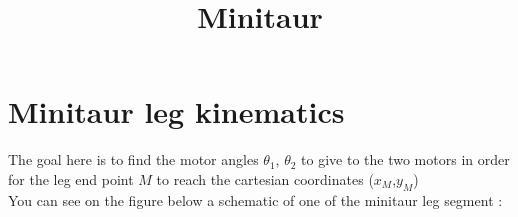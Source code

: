 \documentclass [11pt]{article}
\title{Minitaur}
\begin{document}
\section*{Minitaur leg kinematics}
The goal here is to find the motor angles $\theta_1$, $\theta_2$ to give to the two motors in order for the leg end point $M$ to reach the cartesian coordinates ($x_M$,$y_M$) \\
You can see on the figure below a schematic of one of the minitaur leg segment :

\pagestyle{empty}


%
\newcommand{\nvar}[2]{%
    \newlength{#1}
    \setlength{#1}{#2}
}

\nvar{\dg}{0.3cm}
\def\dw{0.25}\def\dh{0.5}
\nvar{\ddx}{1.5cm}

\def\link{\draw [double distance=1.5mm, very thick] (0,0)--}
\def\joint{%
    \filldraw [fill=white] (0,0) circle (5pt);
    \fill[black] circle (2pt);
}
\def\grip{%
    \draw[ultra thick](0cm,\dg)--(0cm,-\dg);
    \fill (0cm, 0.5\dg)+(0cm,1.5pt) -- +(0.6\dg,0cm) -- +(0pt,-1.5pt);
    \fill (0cm, -0.5\dg)+(0cm,1.5pt) -- +(0.6\dg,0cm) -- +(0pt,-1.5pt);
}
\def\robotbase{%
    \draw[rounded corners=8pt] (-\dw,-\dh)-- (-\dw, 0) --
        (0,\dh)--(\dw,0)--(\dw,-\dh);
    \draw (-0.5,-\dh)-- (0.5,-\dh);
    \fill[pattern=north east lines] (-0.5,-1) rectangle (0.5,-\dh);
}

\newcommand{\angann}[2]{%
    \begin{scope}[red]
    \draw [->, black] (0,0) -- (0pt,1.2\ddx);
    \node at (0pt,1.5\ddx) {x};
    \draw [->, black] (0,0) -- (-1.2\ddx,0pt);
    \node at (-1.5\ddx,0pt) {y};
    \draw [->, shorten >=3.5pt] (0pt,\ddx) arc (90:#1:\ddx);
    \node at (#1/2-2:\ddx+8pt) {#2};
    \end{scope}
}

\newcommand{\lineann}[4][0.5]{%
    \begin{scope}[rotate=#2, blue,inner sep=2pt]
        \draw[dashed, blue!40] (0,0) -- +(0,#1)
            node [coordinate, near end] (a) {};
        \draw[dashed, blue!40] (#3,0) -- +(0,#1)
            node [coordinate, near end] (b) {};
        \draw[|<->|] (a) -- node[fill=white] {#4} (b);
    \end{scope}
}
\end{document}
